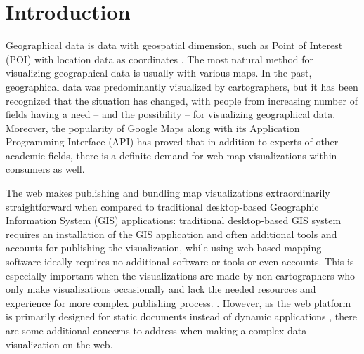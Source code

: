 
\chapter{Introduction}
\label{chapter:intro}


Geographical data is data with geospatial dimension, such as Point of Interest (POI) with location data as coordinates \citep[chap.~1.2]{kraak_cartography_2011}. The most natural method for visualizing geographical data is usually with various maps. In the past, geographical data was predominantly visualized by cartographers, but it has been recognized \citep{kraak_visualization_1999} that the situation has changed, with people from increasing number of fields having a need -- and the possibility \citep[chap.~1]{slocum_thematic_2014} -- for visualizing geographical data. Moreover, the popularity of Google Maps \citep{google_maps_2005-1} along with its Application Programming Interface (API) \citep{google_maps_2005} has proved that in addition to experts of other academic fields, there is a definite demand for web map visualizations within consumers as well. 

The web makes publishing and bundling map visualizations extraordinarily straightforward when compared to traditional desktop-based Geographic Information System (GIS) applications: traditional desktop-based GIS system requires an installation of the GIS application and often additional tools and accounts for publishing the visualization, while using web-based mapping software ideally requires no additional software or tools or even accounts. This is especially important when the visualizations are made by non-cartographers who only make visualizations occasionally and lack the needed resources and experience for more complex publishing process. . However, as the web platform is primarily designed for static documents \citep{berners-lee_information_1989,berners-lee_world-wide_1992} instead of dynamic applications \citep{jazayeri_trends_2007}, there are some additional concerns to address when making a complex data visualization on the web.



